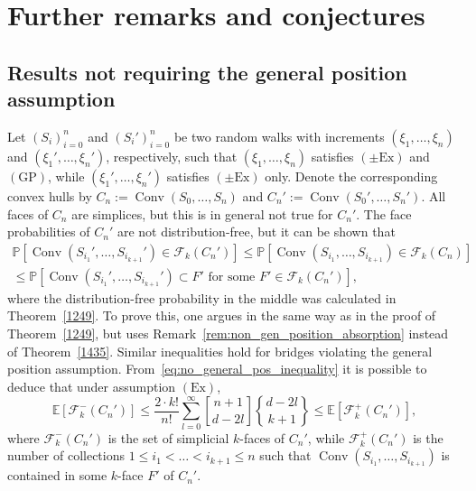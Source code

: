 \documentclass[12pt, reqno]{amsart}
\theoremstyle{plain}
\theoremstyle{definition}
\theoremstyle{remark}
\begin{document}
\section{Further remarks and conjectures}

\subsection{Results not requiring the general position assumption}
Let $(S_i)_{i=0}^n$ and $(S_i')_{i=0}^n$ be two random walks with increments $(\xi_1,\ldots, \xi_n)$ and $(\xi_1',\ldots, \xi_n')$, respectively, such that $(\xi_1,\ldots, \xi_n)$ satisfies $(\pm\text{Ex})$ and $(\text{GP})$, while $(\xi_1',\ldots, \xi_n')$ satisfies $(\pm\text{Ex})$ only.  Denote the corresponding convex hulls by $C_n := {\mathop{\mathrm{Conv}}\nolimits}(S_0,\ldots,S_n)$ and $C_n' := {\mathop{\mathrm{Conv}}\nolimits}(S_0',\ldots,S_n')$. All faces of $C_n$ are simplices, but this is in general not true for $C_n'$. The face probabilities of $C_n'$ are not distribution-free, but it can be shown that
\begin{multline}\label{eq:no_general_pos_inequality}
{\mathbb{P}}[{\mathop{\mathrm{Conv}}\nolimits} (S_{i_1}', \ldots, S_{i_{k+1}}') \in \mathcal F_k(C_n')]
\leq
{\mathbb{P}}[{\mathop{\mathrm{Conv}}\nolimits} (S_{i_1}, \ldots, S_{i_{k+1}}) \in \mathcal F_k(C_n)]\\
\leq
{\mathbb{P}}[{\mathop{\mathrm{Conv}}\nolimits} (S_{i_1}', \ldots, S_{i_{k+1}}')\subset F' \text{ for some } F' \in \mathcal F_k(C_n')],
\end{multline}
where the distribution-free  probability in the middle was calculated in Theorem~\ref{1249}. To prove this, one argues in the same way as in the proof of Theorem~\ref{1249}, but uses Remark~\ref{rem:non_gen_position_absorption} instead of Theorem~\ref{1435}. Similar inequalities hold for bridges violating the general position assumption.
From~\eqref{eq:no_general_pos_inequality} it is possible to deduce that under assumption $(\text{Ex})$,
$$
{\mathbb E} [\mathcal F^{-}_k (C_n')] \leq  \frac{2\cdot k!}{n!} \sum_{l=0}^{\infty}{\genfrac{[}{]}{0pt}{}{{n+1}}{{d-2l}}}  {\genfrac{\{}{\}}{0pt}{}{{d-2l}}{{k+1}}}
\leq
{\mathbb E} [\mathcal F^{+}_k (C_n')],
$$
where $\mathcal F^{-}_k(C_n')$ is the set of simplicial $k$-faces of $C_n'$, while $\mathcal F^{+}_k(C_n')$ is the number of collections $1\leq i_1 < \ldots < i_{k+1} \leq n$ such that ${\mathop{\mathrm{Conv}}\nolimits}(S_{i_1}, \ldots, S_{i_{k+1}})$ is contained in some $k$-face $F'$ of $C_n'$.
\end{document}
